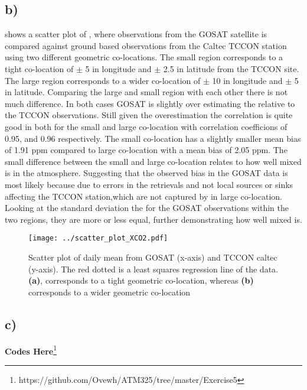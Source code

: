 \subsection*{b)}
 shows a scatter plot of , where observations
from the GOSAT satellite is compared against ground based observations from
the Caltec TCCON station using two different geometric co-locations. The 
small region  corresponds to a tight co-location of $\pm$ 5 \degree in longitude
and $\pm$ 2.5 \degree in latitude from the TCCON site. The large region
corresponds to a wider co-location of $\pm$ 10 \degree in longitude and $\pm$
5 \degree in latitude. Comparing the large and small region with each other
there is not much difference.  In both cases GOSAT is slightly over estimating
the  relative to the TCCON observations. Still given the overestimation
the correlation is quite good in both for the small and large co-location with
correlation coefficions of 0.95, and 0.96 respectively. The small co-location
has a slightly smaller mean bias of 1.91 ppm compared to large co-location with
a mean bias of 2.05 ppm. The small difference between the small and large
co-location relates to how well mixed  is in the atmosphere. Suggesting
that the observed bias in the GOSAT data is most likely because due to errors in
the retrievals and not local sources or sinks affecting the TCCON station,which
are not captured by in large co-location. Looking at the standard deviation the
for the GOSAT observations within the two regions, they are more or less equal,
further demonstrating how well mixed  is.      
\begin{figure}[htbp]
    \centering
    \texttt{[image: ../scatter\_plot\_XCO2.pdf]}
    \caption{Scatter plot of daily mean  from GOSAT (x-axis) and TCCON caltec (y-axis). The red dotted is a least squares regression line of the data. \textbf{(a)}, corresponds to a tight geometric co-location, whereas \textbf{(b)} corresponds to a wider geometric co-location}
    \label{fig:scatter_XCO2}
\end{figure}

\subsection*{c)}

\textbf{Codes Here}\footnote{https://github.com/Ovewh/ATM325/tree/master/Exercise5}